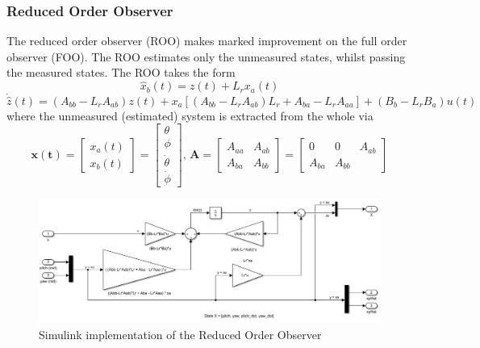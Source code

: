 \documentclass[11pt]{article}
\begin{document}
\subsubsection{Reduced Order Observer}
The reduced order observer (ROO) makes marked improvement on the full order observer (FOO). The ROO estimates only the unmeasured states, whilst passing the measured states.
The ROO takes the form
\begin{equation*}
    \hat{x}_b(t) = z(t) + L_r x_a(t)
\end{equation*}
\begin{equation*}
    \dot{\hat{z}}(t) = (A_{bb} - L_r A_{ab})z(t) + x_a [ (A_{bb} - L_r A_{ab})L_r + A_{ba} - L_r A_{aa} ] + (B_b-L_rB_a)u(t)
\end{equation*}
where the unmeasured (estimated) system is extracted from the whole via
\begin{equation*}
    \mathbf{x(t)} = \begin{bmatrix}
        x_a(t) \\ x_b(t)
    \end{bmatrix}
    = \begin{bmatrix}
        \theta \\ \phi \\ \dot{\theta} \\ \dot{\phi}
    \end{bmatrix}
    
    \text{, }
    \mathbf{A} = \begin{bmatrix}
        A_{aa} & A_{ab} \\ A_{ba} & A_{bb}
    \end{bmatrix}
    = \begin{bmatrix}
        0 & 0 & A_{ab} \\ A_{ba} & A_{bb}
    \end{bmatrix}
    
\end{equation*}


\begin{figure}[H]
    \centering
    \includegraphics[width=15cm]{plots/Reduced-Order-Observer.PNG}
    \caption{Simulink implementation of the Reduced Order Observer}
    \label{fig:W4_ROO}
\end{figure}
\end{document}
